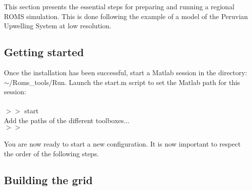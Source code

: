 This section presents the essential steps for preparing
and running a regional ROMS simulation. This is 
done following the example of a model of the
Peruvian Upwelling System at low resolution.
 
\subsection{Getting started}

Once the installation has been successful, start a Matlab session
in the directory: $\sim$/Roms\_tools/Run. Launch the start.m
script to set the Matlab path for this session: \\
\\
$>>$ start \\
Add the paths of the different toolboxes... \\
$>>$ \\
\\
You are now ready to start a new configuration.
It is now important to respect the order of the following steps.

\subsection{Building the grid}

